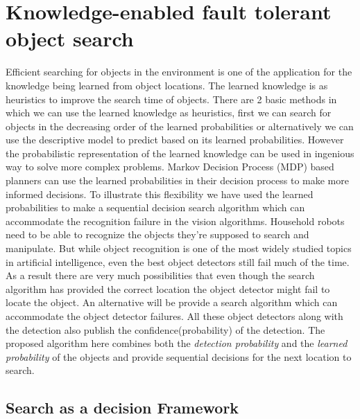 
\chapter{Knowledge-enabled fault tolerant object search}
\label{cha}

Efficient searching for objects in the environment is one of the application for the knowledge being learned from object locations. The learned knowledge is as heuristics to improve the search time of objects. There are 2 basic methods in which we can use the learned knowledge as heuristics, first we can search for objects in the decreasing order of the learned probabilities or alternatively we can use the descriptive model to predict based on its learned probabilities. However the probabilistic representation of the learned knowledge can be used in ingenious way to solve more complex problems. Markov Decision Process (MDP) based planners can use the learned probabilities in their decision process to make more informed decisions. To illustrate this flexibility we have used the learned probabilities to make a sequential decision search algorithm which can accommodate the recognition failure in the vision algorithms.
Household robots need to be able to recognize the objects they’re supposed to search and manipulate. But while object recognition is one of the most widely studied topics in artificial intelligence, even the best object detectors still fail much of the time. As a result there are very much possibilities that even though the search algorithm has provided the correct location the object detector might fail to locate the object. An alternative will be provide a search algorithm which can accommodate the object detector failures. All these object detectors along with the detection also publish the confidence(probability) of the detection. The proposed algorithm here combines both the \emph{detection probability} and the \emph{learned probability} of the objects and provide sequential decisions for the next location to search.

\section{Search as a decision Framework}

